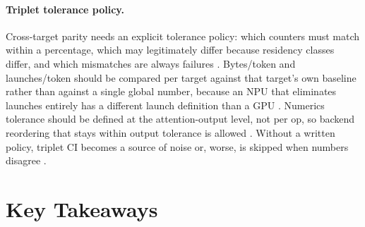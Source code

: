 \paragraph{Triplet tolerance policy.}
Cross-target parity needs an explicit tolerance policy: which counters must match within a percentage, which may legitimately differ because residency classes differ, and which mismatches are always failures \citep{patel2025llminference,yirage2026,chen2020compilerbasedhardw}. Bytes/token and launches/token should be compared per target against that target's own baseline rather than against a single global number, because an NPU that eliminates launches entirely has a different launch definition than a GPU \citep{amd2024xdna,amd2024aie,memoryfloor2026}. Numerics tolerance should be defined at the attention-output level, not per op, so backend reordering that stays within output tolerance is allowed \citep{dao2022flashattention,patel2025llminference}. Without a written policy, triplet CI becomes a source of noise or, worse, is skipped when numbers disagree \citep{taxbreak2026,memoryfloor2026}.

\section{Key Takeaways}
\label{sec:ch13_key_takeaways}

